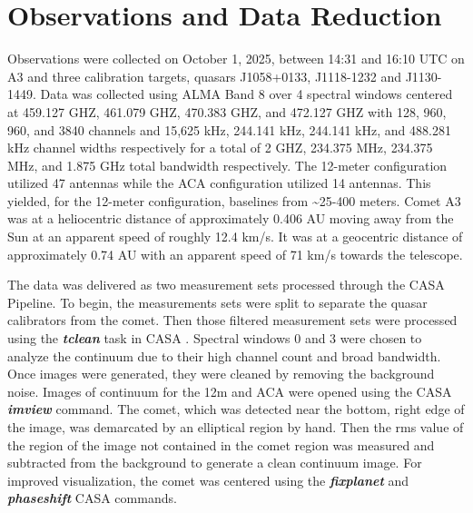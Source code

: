 \section{Observations and Data Reduction}

Observations were collected on October 1, 2025, between 14:31 and 16:10 UTC on A3 and three calibration targets, quasars J1058+0133, J1118-1232 and J1130-1449. Data was collected using ALMA Band 8 over 4 spectral windows centered at 459.127 GHZ, 461.079 GHZ, 470.383 GHZ, and 472.127 GHZ with 128, 960, 960, and 3840 channels and 15,625 kHz, 244.141 kHz, 244.141 kHz, and 488.281 kHz channel widths respectively for a total of 2 GHZ, 234.375 MHz, 234.375 MHz, and 1.875 GHz total bandwidth respectively. The 12-meter configuration utilized 47 antennas while the ACA configuration utilized 14 antennas. This yielded, for the 12-meter configuration, baselines from \textasciitilde25-400 meters. Comet A3 was at a heliocentric distance of approximately 0.406 AU moving away from the Sun at an apparent speed of roughly 12.4 km/s. It was at a geocentric distance of approximately 0.74 AU with an apparent speed of 71 km/s towards the telescope. 


The data was delivered as two measurement sets processed through the CASA Pipeline. To begin, the measurements sets were split to separate the quasar calibrators from the comet. Then those filtered measurement sets were processed using the \emph{\textbf{tclean}} task in CASA \citep{McMullin2007}. Spectral windows 0 and 3 were chosen to analyze the continuum due to their high channel count and broad bandwidth. Once images were generated, they were cleaned by removing the background noise. Images of continuum for the 12m and ACA were opened using the CASA \emph{\textbf{imview}} command. The comet, which was detected near the bottom, right edge of the image, was demarcated by an elliptical region by hand. Then the rms value of the region of the image not contained in the comet region was measured and subtracted from the background to generate a clean continuum image. For improved visualization, the comet was centered using the \emph{\textbf{fixplanet}} and \emph{\textbf{phaseshift}} CASA commands.


